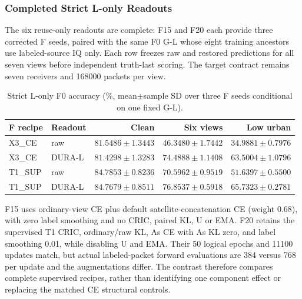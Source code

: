 \subsubsection{Completed Strict L-only Readouts}

The six reuse-only readouts are complete: F15 and F20 each provide three corrected F seeds, paired with the same F0 G-L whose eight training ancestors use labeled-source IQ only. Each row freezes raw and restored predictions for all seven views before independent truth-last scoring. The target contract remains seven receivers and 168000 packets per view.

\begin{table}[t]

\centering\scriptsize

\caption{Strict L-only F0 accuracy (\%, mean$\pm$sample SD over three F seeds conditional on one fixed G-L).}

\label{tab:Lonly6}

\setlength{\tabcolsep}{2pt}

\begin{tabular}{llrrr}

\toprule

F recipe & Readout & Clean & Six views & Low urban \\

\midrule

X3\_CE & raw & $81.5486\pm1.3443$ & $46.3480\pm1.7442$ & $34.9881\pm0.7976$ \\

X3\_CE & DURA-L & $81.4298\pm1.3283$ & $74.4888\pm1.1408$ & $63.5004\pm1.0796$ \\

T1\_SUP & raw & $84.7853\pm0.8236$ & $70.5962\pm0.9519$ & $51.6397\pm0.5500$ \\

T1\_SUP & DURA-L & $84.7679\pm0.8511$ & $76.8537\pm0.5918$ & $65.7323\pm0.2781$ \\

\bottomrule

\end{tabular}

\end{table}

F15 uses ordinary-view CE plus default satellite-concatenation CE (weight 0.68), with zero label smoothing and no CRIC, paired KL, U or EMA. F20 retains the supervised T1 CRIC, ordinary/raw KL, As CE with As KL zero, and label smoothing 0.01, while disabling U and EMA. Their 50 logical epochs and 11100 updates match, but actual labeled-packet forward evaluations are 384 versus 768 per update and the augmentations differ. The contrast therefore compares complete supervised recipes, rather than identifying one component effect or replacing the matched CE structural controls.

